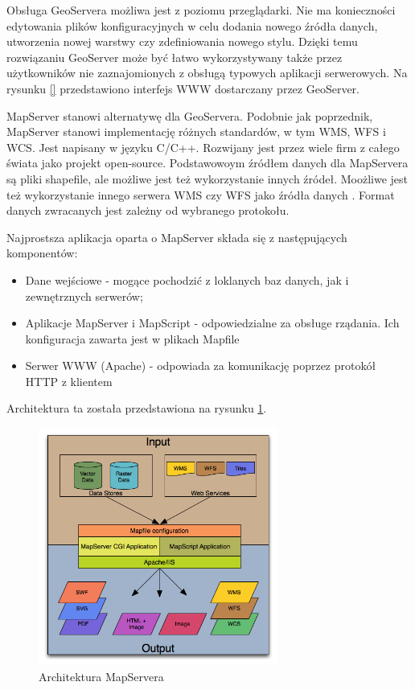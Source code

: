 Obsługa GeoServera możliwa jest z poziomu przeglądarki. Nie ma konieczności edytowania plików konfiguracyjnych
w celu dodania nowego źródła danych, utworzenia nowej warstwy czy zdefiniowania nowego stylu. Dzięki temu rozwiązaniu
GeoServer może być łatwo wykorzystywany także przez użytkowników nie zaznajomionych z obsługą typowych aplikacji serwerowych.
Na rysunku \ref{} przedstawiono interfejs WWW dostarczany przez GeoServer.

MapServer stanowi alternatywę dla GeoServera. Podobnie jak poprzednik, MapServer stanowi implementację różnych standardów,
w tym WMS, WFS i WCS. Jest napisany w języku C/C++. Rozwijany jest przez wiele firm z całego świata jako projekt open-source.
Podstawowoym źródłem danych dla MapServera są pliki shapefile, ale możliwe jest też wykorzystanie innych źródeł. 
Moożliwe jest też wykorzystanie innego serwera WMS czy WFS jako źródła danych \cite{MapServer2011}.
Format danych zwracanych jest zależny od wybranego protokołu.

Najprostsza aplikacja oparta o MapServer składa się z następujących komponentów:
\begin{itemize}
    \item Dane wejściowe - mogące pochodzić z loklanych baz danych, jak i zewnętrznych serwerów;
    \item Aplikacje MapServer i MapScript - odpowiedzialne za obsługe rządania. Ich konfiguracja zawarta jest w plikach Mapfile
    \item Serwer WWW (Apache) - odpowiada za komunikację poprzez protokół HTTP z klientem
\end{itemize}

Architektura ta została przedstawiona na rysunku \ref{fig:mapserver_architecture}.
\begin{figure}[h!]
    \centering
    \includegraphics[width=0.7\textwidth]{img/mapserver_architecture.png}
    \caption{Architektura MapServera}
    \label{fig:mapserver_architecture}
\end{figure}

